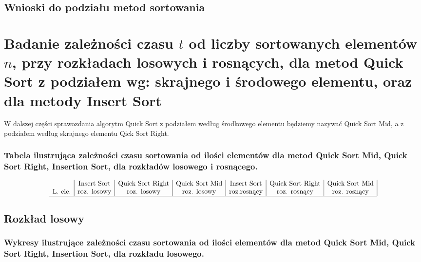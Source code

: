 \documentclass[polish,polish,a4paper]{article}
\begin{document}
\begin{spacing}{1.5}
\subsection{Wnioski do podziału metod sortowania}

\section{Badanie zależności czasu $t$ od liczby sortowanych elementów $n$, przy rozkładach losowych i rosnących, dla metod Quick Sort z podziałem wg: skrajnego i środowego elementu, oraz dla metody Insert Sort}

W dalszej części sprawozdania algorytm Quick Sort z podziałem według środkowego elementu będziemy nazywać Quick Sort Mid, a z podziałem według skrajnego elementu Qick Sort Right.


	\subsubsection*{Tabela ilustrująca zależności czasu sortowania od ilości elementów dla metod Quick Sort Mid, Quick Sort Right, Insertion Sort, dla rozkładów losowego i rosnącego.}


\begin{figure}[H]
	\begin{equation*}
	\begin{array}{l|c|c|c|c|c|c|}
	
	&$Insert Sort$&$Quick Sort Right$&$Quick Sort Mid$&$Insert Sort$&$Quick Sort Right$&$Quick Sort Mid$\\
	$L. ele.$&$roz. losowy$&$roz. losowy$&$roz. losowy$&$roz.rosnący$&$roz. rosnący$&$roz. rosnący$\\
	\hline
	\end{array}
	\end{equation*}
\end{figure}

\subsection{Rozkład losowy}

\subsubsection*{Wykresy ilustrujące zależności czasu sortowania od ilości elementów dla metod Quick Sort Mid, Quick Sort Right, Insertion Sort, dla rozkładu losowego.}


\end{spacing}
\end{document}
